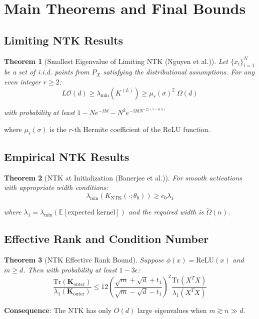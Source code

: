 \documentclass{article}
\newtheorem{theorem}{Theorem}[section]
\newcommand{\E}{\mathbb{E}}
\newcommand{\evmin}[1]{\lambda_{\min}\left(#1\right)}
\newcommand{\bigOmg}{\Omega}
\newcommand{\KNTK}{K_{\text{NTK}}}
\newcommand{\lambdaMin}{\lambda_{\min}}
\newcommand{\Order}{\mathcal{O}}
\newcommand{\TildeOmega}{\tilde{\Omega}}
\begin{document}
\newpage
\section{Main Theorems and Final Bounds}

\subsection{Limiting NTK Results}

\begin{theorem}[Smallest Eigenvalue of Limiting NTK (Nguyen et al.)]
Let $\{x_i\}_{i=1}^{N}$ be a set of i.i.d. points from $P_X$ satisfying the distributional assumptions. For any even integer $r\ge 2$:
$$L\Order(d) \geq \evmin{K^{(L)}} \geq \mu_r(\sigma)^2\; \bigOmg(d)$$

with probability at least $1 - Ne^{-\bigOmg{d}} - N^2e^{-\bigOmg{dN^{-2/(r-0.5)}}}$
\end{theorem}

where $\mu_r(\sigma)$ is the $r$-th Hermite coefficient of the ReLU function.

\subsection{Empirical NTK Results}

\begin{theorem}[NTK at Initialization (Banerjee et al.)]
For smooth activations with appropriate width conditions:
$$\lambdaMin(\KNTK(\cdot;\theta_0)) \geq c_0 \lambda_1$$

where $\lambda_1 = \lambdaMin(\E[\text{expected kernel}])$ and the required width is $\TildeOmega(n)$.
\end{theorem}

\subsection{Effective Rank and Condition Number}

\begin{theorem}[NTK Effective Rank Bound]
Suppose $\phi(x) = \text{ReLU}(x)$ and $m \geq d$. Then with probability at least $1 - 3\epsilon$:
$$\frac{\text{Tr}(\mathbf{K}_{\text{outer}})}{\lambda_1(\mathbf{K}_{\text{outer}})} \leq 12 \left(\frac{\sqrt{m} + \sqrt{d} + t_1}{\sqrt{m} - \sqrt{d} - t_1}\right)^2 \frac{\text{Tr}(X^T X)}{\lambda_1(X^T X)}$$
\end{theorem}

\textbf{Consequence}: The NTK has only $O(d)$ large eigenvalues when $m \gtrsim n \gg d$.
\end{document}
